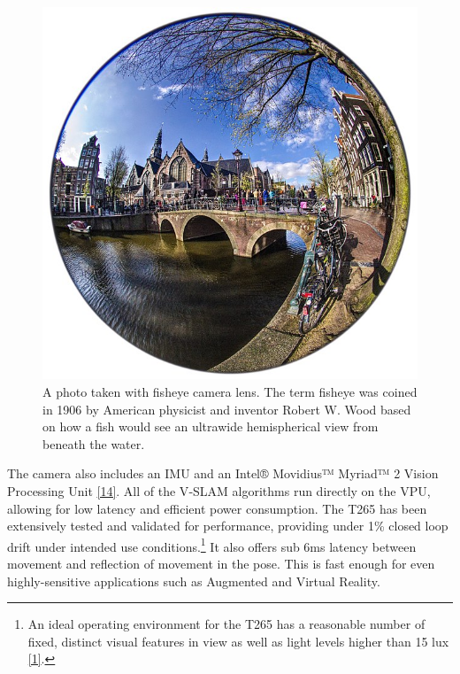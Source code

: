 \documentclass{article}
\begin{document}
\begin{figure}[h] %
	\centering
	\includegraphics[width=1\columnwidth]{report1-img003.png} %
	\caption{A photo taken with fisheye camera lens. The term fisheye was coined in 1906 by American physicist and inventor Robert W. Wood based on how a fish would see an ultrawide hemispherical view from beneath the water.}
\end{figure}

\clearpage

The camera also includes an IMU and an Intel® Movidius™ Myriad™ 2 Vision Processing Unit \href{https://www.intel.com/content/www/us/en/products/details/processors/movidius-vpu.html}{[14]}. All of the V‑SLAM algorithms run directly on the VPU, allowing for low latency and efficient power consumption. The T265 has been extensively tested and validated for performance, providing under 1\% closed loop drift under intended use conditions.\footnote{An ideal operating environment for the T265 has a reasonable number of fixed, distinct visual features in view as well as light levels higher than 15 lux \href{https://www.intelrealsense.com/tracking-camera-t265/}{[1]}. } It also offers sub 6ms latency between movement and reflection of movement in the pose. This is fast enough for even highly-sensitive applications such as Augmented and Virtual Reality. 
\end{document}
